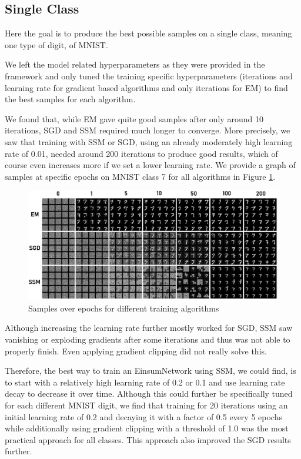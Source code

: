 \subsection{Single Class}
\label{sec:exp_mnist_single}

Here the goal is to produce the best possible samples on a single class, meaning one type of digit, of MNIST.

We left the model related hyperparameters as they were provided in the framework and only tuned the training specific hyperparameters 
(iterations and learning rate for gradient based algorithms and only iterations for EM) to find the best samples for each algorithm. 

We found that, while EM gave quite good samples after only around 10 iterations, SGD and SSM required much longer to converge. 
More precisely, we saw that training with SSM or SGD, using an already moderately high learning rate
of 0.01, needed around 200 iterations to produce good results, which of course even increases more if we set a lower learning rate.
We provide a graph of samples at specific epochs on MNIST class 7 for all algorithms in Figure \ref{fig:mnist_epochs}.\\ 

\begin{figure}[H]
    \centering
    \includegraphics[width=\textwidth]{figures/einsum/mnist/epoch_comparison.png}
    \caption{Samples over epochs for different training algorithms}
    \label{fig:mnist_epochs}
\end{figure}

Although increasing the learning rate further mostly worked for SGD, SSM saw vanishing or exploding gradients after some iterations and thus was
not able to properly finish. Even applying gradient clipping did not really solve this. 

Therefore, the best way to train an EinsumNetwork using SSM, we could find, is to start with a relatively 
high learning rate of 0.2 or 0.1 and use learning rate decay to decrease it over time. Although
this could further be specifically tuned for each different MNIST digit, we find that training for 
20 iterations using an initial learning rate of 0.2 and decaying it with a factor of 0.5 every 5 epochs 
while additionally using gradient clipping with a threshold of 1.0 was the most practical approach for all classes.
This approach also improved the SGD results further.

